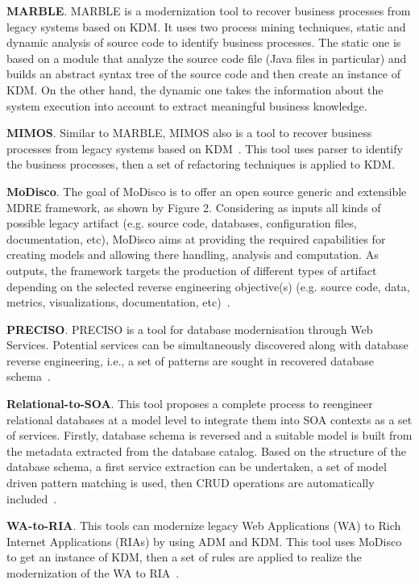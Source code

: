 \textbf{MARBLE}. MARBLE is a modernization tool to recover business processes from legacy systems based on KDM. It uses two process mining techniques, static and dynamic analysis of source code to identify business processes. The static one is based on a module that analyze the source code file (Java files in particular) and builds an abstract syntax tree of the source code and then create an instance of KDM. On the other hand, the dynamic one takes the information about the system execution into account to extract meaningful business knowledge.

\textbf{MIMOS}. Similar to MARBLE, MIMOS also is a tool to recover business processes from legacy systems based on KDM~\cite{6498507}. This tool uses parser to identify the business processes, then a set of refactoring techniques is applied to KDM.

\textbf{MoDisco}. The goal of MoDisco is to offer an open source generic and extensible MDRE framework, as shown by Figure 2. Considering as inputs all kinds of possible legacy artifact (e.g. source code, databases, configuration files, documentation, etc), MoDisco aims at providing the required capabilities for creating models and allowing there handling, analysis and computation. As outputs, the framework targets the production of different types of artifact depending on the selected reverse engineering objective(s) (e.g. source code, data, metrics, visualizations, documentation, etc)~\cite{Bruneliere:2010:MGE:1858996.1859032}.

\textbf{PRECISO}. PRECISO is a tool for database modernisation through Web Services. Potential services can be simultaneously discovered along with database reverse engineering, i.e., a set of patterns are sought in recovered database schema~\cite{delCastillo:2009:PRP:1529282.1529753}.

\textbf{Relational-to-SOA}. This tool proposes a complete process to reengineer relational databases at a model level to integrate them into SOA contexts as a set of services. Firstly, database schema is reversed and a suitable model is built from the metadata extracted from the database catalog. Based on the structure of the database schema, a first service extraction can be undertaken, a set of model driven pattern matching is used, then CRUD operations are automatically included~\cite{Guzman:2007:AAR:1339262.1339532}.

\textbf{WA-to-RIA}. This tools can modernize legacy Web Applications (WA) to Rich Internet Applications (RIAs) by using ADM and KDM. This tool uses MoDisco to get an instance of KDM, then a set of rules are applied to realize the modernization of the WA to RIA~\cite{Rodriguez-Echeverria:2011:MLW:2186508.2186536}.

